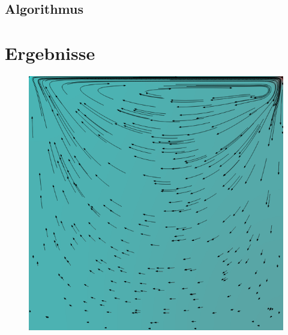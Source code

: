 
		\subsection{Algorithmus} %
		\label{sub:algorithmus}
		



	\section{Ergebnisse} %
	\label{sec:ergebnisse}
	
		\begin{frame}
			\begin{figure}
				\centering
				\includegraphics[scale=0.4]{images/re-1000-512-00520.png}
			\end{figure}
		\end{frame}


